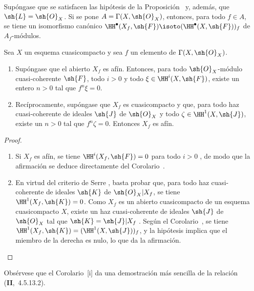 \documentclass[oneside]{amsart}
\let\EGAOriginalLabel\label
\renewcommand{\label}[1]{\phantomsection\EGAOriginalLabel{#1}}
\begin{document}
\begin{corollary}[1.4.6]
\label{III.1.4.6}
Supóngase que se satisfacen las hipótesis de la Proposición~\textup{} y, además, que $\sh{L}=\sh{O}_X$.
Si se pone $A=\Gamma(X,\sh{O}_X)$, entonces, para todo $f\in A$, se tiene un isomorfismo canónico $\HH^\bullet(X_f,\sh{F})\isoto(\HH^\bullet(X,\sh{F}))_f$ de $A_f$-módulos.
\end{corollary}

\begin{corollary}[1.4.7]
\label{III.1.4.7}
Sea $X$ un esquema cuasicompacto y sea $f$ un elemento de $\Gamma(X,\sh{O}_X)$.
\begin{enumerate}
  \item[{\rm(i)}] Supóngase que el abierto $X_f$ es afín.
    Entonces, para todo $\sh{O}_X$-módulo cuasi-coherente $\sh{F}$, todo $i>0$ y todo $\xi\in\HH^i(X,\sh{F})$, existe un entero $n>0$ tal que $f^n\xi=0$.
  \item[{\rm(ii)}] Recíprocamente, supóngase que $X_f$ es cuasicompacto y que, para todo haz cuasi-coherente de ideales $\sh{J}$ de $\sh{O}_X$ y todo $\zeta\in\HH^1(X,\sh{J})$, existe un $n>0$ tal que $f^n\zeta=0$.
    Entonces $X_f$ es afín.
\end{enumerate}
\end{corollary}

\begin{proof}
\medskip\noindent
\begin{enumerate}
  \item[(i)] Si $X_f$ es afín, se tiene $\HH^i(X_f,\sh{F})=0$ para todo $i>0$ , de modo que la afirmación se deduce directamente del Corolario~.
  \item[(ii)] En virtud del criterio de Serre , basta probar que, para todo haz cuasi-coherente de ideales $\sh{K}$ de $\sh{O}_X|X_f$, se tiene $\HH^1(X_f,\sh{K})=0$.
    Como $X_f$ es un abierto cuasicompacto de un esquema cuasicompacto $X$, existe un haz cuasi-coherente de ideales $\sh{J}$ de $\sh{O}_X$ tal que $\sh{K}=\sh{J}|X_f$ .
    Según el Corolario~, se tiene $\HH^1(X_f,\sh{K})=(\HH^1(X,\sh{J}))_f$, y la hipótesis implica que el miembro de la derecha es nulo, lo que da la afirmación.
\end{enumerate}
\end{proof}

\begin{remark}[1.4.8]
\label{III.1.4.8}
Obsérvese que el Corolario~[i] da una demostración más sencilla de la relación (\textbf{II},~4.5.13.2).
\end{remark}
\end{document}

